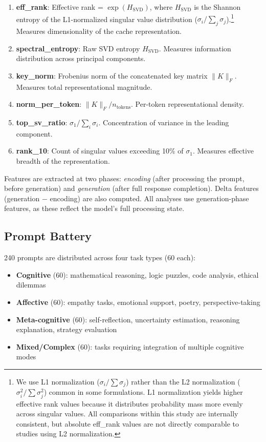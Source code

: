 \documentclass[11pt,a4paper]{article}
\begin{document}
\begin{enumerate}
    \item \textbf{eff\_rank}: Effective rank = $\exp(H_{\text{SVD}})$, where $H_{\text{SVD}}$ is the Shannon entropy of the L1-normalized singular value distribution ($\sigma_i / \sum_j \sigma_j$).\footnote{We use L1 normalization ($\sigma_i / \sum \sigma_j$) rather than the L2 normalization ($\sigma_i^2 / \sum \sigma_j^2$) common in some formulations. L1 normalization yields higher effective rank values because it distributes probability mass more evenly across singular values. All comparisons within this study are internally consistent, but absolute eff\_rank values are not directly comparable to studies using L2 normalization.} Measures dimensionality of the cache representation.
    \item \textbf{spectral\_entropy}: Raw SVD entropy $H_{\text{SVD}}$. Measures information distribution across principal components.
    \item \textbf{key\_norm}: Frobenius norm of the concatenated key matrix $\|K\|_F$. Measures total representational magnitude.
    \item \textbf{norm\_per\_token}: $\|K\|_F / n_{\text{tokens}}$. Per-token representational density.
    \item \textbf{top\_sv\_ratio}: $\sigma_1 / \sum_i \sigma_i$. Concentration of variance in the leading component.
    \item \textbf{rank\_10}: Count of singular values exceeding 10\% of $\sigma_1$. Measures effective breadth of the representation.
\end{enumerate}

Features are extracted at two phases: \emph{encoding} (after processing the prompt, before generation) and \emph{generation} (after full response completion). Delta features (generation $-$ encoding) are also computed. All analyses use generation-phase features, as these reflect the model's full processing state.

\subsection{Prompt Battery}

240 prompts are distributed across four task types (60 each):

\begin{itemize}
    \item \textbf{Cognitive} (60): mathematical reasoning, logic puzzles, code analysis, ethical dilemmas
    \item \textbf{Affective} (60): empathy tasks, emotional support, poetry, perspective-taking
    \item \textbf{Meta-cognitive} (60): self-reflection, uncertainty estimation, reasoning explanation, strategy evaluation
    \item \textbf{Mixed/Complex} (60): tasks requiring integration of multiple cognitive modes
\end{itemize}
\end{document}
